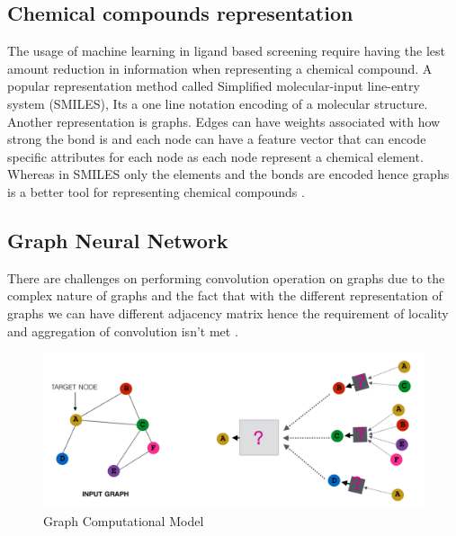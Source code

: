 \documentclass[10pt,twocolumn,letterpaper]{article}
\begin{document}
\subsection{Chemical compounds representation}
The usage of machine learning in ligand based screening require having the lest amount reduction in information when representing a chemical compound. A popular representation method called Simplified molecular-input line-entry system (SMILES), Its a one line notation encoding of a molecular structure. Another representation is graphs. Edges can have weights associated with how strong the bond is and each node can have a feature vector that can encode specific attributes for each node as each node represent a chemical element. Whereas in SMILES only the elements and the bonds are encoded hence graphs is a better tool for representing chemical compounds \cite{Toropov2011}. 


\subsection{Graph Neural Network}

There are challenges on performing convolution operation on graphs due to the complex nature of graphs and the fact that with the different representation of graphs we can have different adjacency matrix hence the requirement of locality and aggregation of convolution isn't met \cite{Kipf2017}. 


\begin{figure}[h!]
  \includegraphics[width=\linewidth]{graph.png}
  \caption{Graph Computational Model}
  \label{fig:graph}
\end{figure}
\end{document}
